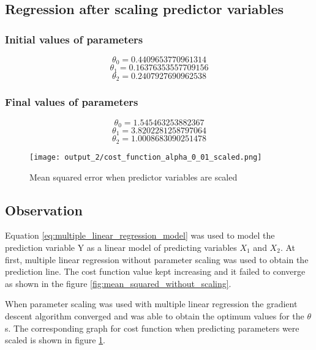 \subsection{Regression after scaling predictor variables}
\subsubsection{Initial values of parameters}
\begin{equation}
\theta_0 = 0.4409653770961314
\end{equation}
\begin{equation}
\theta_1 = 0.16376353557709156
\end{equation}
\begin{equation}
\theta_2 = 0.2407927690962538
\end{equation}

\subsubsection{Final values of parameters}
\begin{equation}
\theta_0 = 1.545463253882367
\end{equation}
\begin{equation}
\theta_1 = 3.8202281258797064
\end{equation}
\begin{equation}
\theta_2 = 1.0008683090251478
\end{equation}

\begin{figure}[!ht]
    \texttt{[image: output\_2/cost\_function\_alpha\_0\_01\_scaled.png]}
    \caption{Mean squared error when predictor variables are scaled}
    \label{fig:mean_squared_with_scaling}
\end{figure}

\subsection{Observation}
Equation \ref{eq:multiple_linear_regression_model} was used to model the prediction variable Y as a linear model of predicting variables $X_1$ and $X_2$. At first, multiple linear regression without parameter scaling was used to obtain the prediction line. The cost function value kept increasing and it failed to converge as shown in the figure \ref{fig:mean_squared_without_scaling}.

When parameter scaling was used with multiple linear regression the gradient descent algorithm converged and was able to obtain the optimum values for the $\theta$s. The corresponding graph for cost function when predicting parameters were scaled is shown in figure \ref{fig:mean_squared_with_scaling}.
